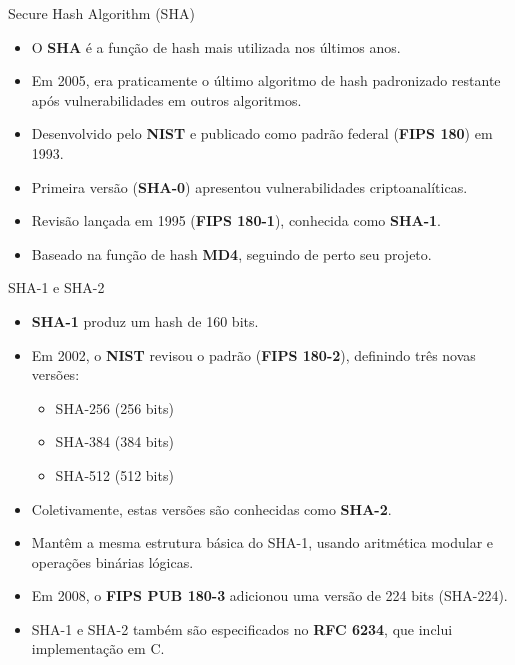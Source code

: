 \begin{frame}{Secure Hash Algorithm (SHA)}
    \begin{itemize}
        \item O \textbf{SHA} é a função de hash mais utilizada nos últimos anos.
        \item Em 2005, era praticamente o último algoritmo de hash padronizado restante após vulnerabilidades em outros algoritmos.
        \item Desenvolvido pelo \textbf{NIST} e publicado como padrão federal (\textbf{FIPS 180}) em 1993.
        \item Primeira versão (\textbf{SHA-0}) apresentou vulnerabilidades criptoanalíticas.
        \item Revisão lançada em 1995 (\textbf{FIPS 180-1}), conhecida como \textbf{SHA-1}.
        \item Baseado na função de hash \textbf{MD4}, seguindo de perto seu projeto.
    \end{itemize}
\end{frame}

\begin{frame}{SHA-1 e SHA-2}
    \begin{itemize}
        \item \textbf{SHA-1} produz um hash de 160 bits.
        \item Em 2002, o \textbf{NIST} revisou o padrão (\textbf{FIPS 180-2}), definindo três novas versões:
              \begin{itemize}
                  \item SHA-256 (256 bits)
                  \item SHA-384 (384 bits)
                  \item SHA-512 (512 bits)
              \end{itemize}
        \item Coletivamente, estas versões são conhecidas como \textbf{SHA-2}.
        \item Mantêm a mesma estrutura básica do SHA-1, usando aritmética modular e operações binárias lógicas.
        \item Em 2008, o \textbf{FIPS PUB 180-3} adicionou uma versão de 224 bits (SHA-224).
        \item SHA-1 e SHA-2 também são especificados no \textbf{RFC 6234}, que inclui implementação em C.
    \end{itemize}
\end{frame}

